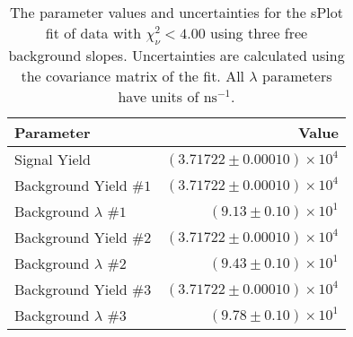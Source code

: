 
\begin{table}[ht]
    \begin{center}
        \begin{tabular}{lr}\toprule
            Parameter & Value \\\midrule
            Signal Yield & $(3.71722 \pm 0.00010) \times 10^{4}$ \\
            Background Yield $\#1$ & $(3.71722 \pm 0.00010) \times 10^{4}$ \\
            Background $\lambda$ $\#1$ & $(9.13 \pm 0.10) \times 10^{1}$ \\
            Background Yield $\#2$ & $(3.71722 \pm 0.00010) \times 10^{4}$ \\
            Background $\lambda$ $\#2$ & $(9.43 \pm 0.10) \times 10^{1}$ \\
            Background Yield $\#3$ & $(3.71722 \pm 0.00010) \times 10^{4}$ \\
            Background $\lambda$ $\#3$ & $(9.78 \pm 0.10) \times 10^{1}$ \\\bottomrule
        \end{tabular}
        \caption{The parameter values and uncertainties for the sPlot fit of data with $\chi^2_\nu < 4.00$ using three free background slopes. Uncertainties are calculated using the covariance matrix of the fit. All $\lambda$ parameters have units of $\si{\nano\second}^{-1}$.}\label{tab:splot-fit-results-chisqdof-4.00-free-3}
    \end{center}
\end{table}
